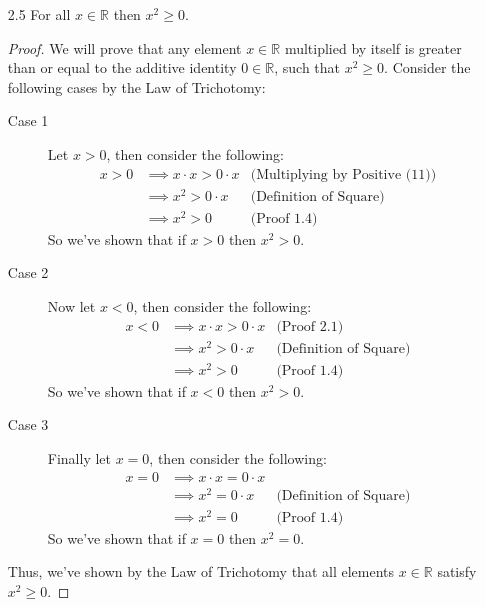 \documentclass[12pt, letterpaper]{article}
\theoremstyle{plain}
\theoremstyle{definition}
\theoremstyle{remark}
\begin{document}
\begin{itemize}
\item[2.5] For all $x\in\mathbb{R}$ then $x^2\ge 0$.
\begin{proof}
We will prove that any element $x\in\mathbb{R}$ multiplied by itself is greater than or equal to the additive identity $0\in\mathbb{R}$, such that $x^2\ge 0$. Consider the following cases by the Law of Trichotomy:
\begin{description}
    \item[Case 1] Let $x>0$, then consider the following:
    \begin{align*}
        x>0 &\implies x\cdot x>0\cdot x &\text{(Multiplying by Positive (11))} \\
            &\implies x^2>0\cdot x      &\text{(Definition of Square)} \\
            &\implies x^2>0             &\text{(Proof 1.4)}
    \end{align*}
    So we've shown that if $x>0$ then $x^2>0$.
    \item[Case 2] Now let $x<0$, then consider the following:
    \begin{align*}
        x<0 &\implies x\cdot x>0\cdot x &\text{(Proof 2.1)} \\
            &\implies x^2>0\cdot x      &\text{(Definition of Square)} \\
            &\implies x^2>0             &\text{(Proof 1.4)}
    \end{align*}
    So we've shown that if $x<0$ then $x^2>0$.
    \item[Case 3] Finally let $x=0$, then consider the following:
    \begin{align*}
        x=0 &\implies x\cdot x=0\cdot x \\
            &\implies x^2=0\cdot x &\text{(Definition of Square)} \\
            &\implies x^2=0        &\text{(Proof 1.4)}
    \end{align*}
    So we've shown that if $x=0$ then $x^2=0$.
\end{description}
Thus, we've shown by the Law of Trichotomy that all elements $x\in\mathbb{R}$ satisfy $x^2\ge 0$.
\end{proof}
    
\end{itemize}
\end{document}
